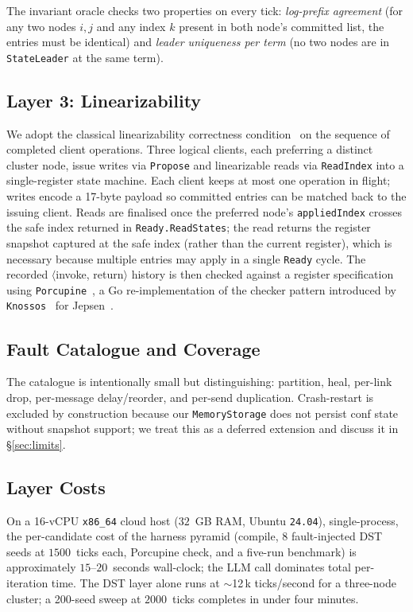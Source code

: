 \documentclass{article}
\begin{document}
The invariant oracle checks two properties on every tick:
\emph{log-prefix agreement} (for any two nodes $i,j$ and any index $k$
present in both node's committed list, the entries must be identical)
and \emph{leader uniqueness per term} (no two nodes are in
\texttt{StateLeader} at the same term).

\subsection{Layer 3: Linearizability}
\label{sec:harness-lin}
We adopt the classical linearizability
correctness condition~\cite{herlihy1990linearizability} on the
sequence of completed client operations. Three logical clients, each
preferring a distinct cluster node, issue writes via \texttt{Propose}
and linearizable reads via \texttt{ReadIndex} into a single-register
state machine. Each client
keeps at most one operation in flight; writes encode a 17-byte payload
 so committed entries can be matched
back to the issuing client. Reads are finalised once the preferred
node's \texttt{appliedIndex} crosses the safe index returned in
\texttt{Ready.ReadStates}; the read returns the register snapshot
captured at the safe index (rather than the current register), which
is necessary because multiple entries may apply in a single
\texttt{Ready} cycle. The recorded $\langle$invoke, return$\rangle$
history is then checked against a register specification using
\texttt{Porcupine}~\cite{porcupine}, a Go re-implementation of the
checker pattern introduced by \texttt{Knossos}~\cite{knossos} for
Jepsen~\cite{jepsen}.

\subsection{Fault Catalogue and Coverage}
The catalogue is intentionally small but distinguishing: partition,
heal, per-link drop, per-message delay/reorder, and per-send
duplication. Crash-restart is excluded by construction because our
\texttt{MemoryStorage} does not persist conf state without snapshot
support; we treat this as a deferred extension and discuss it in
\S\ref{sec:limits}.

\subsection{Layer Costs}
\label{sec:harness-cost}
On a 16-vCPU \texttt{x86\_64} cloud host ($32$~GB RAM, Ubuntu
\texttt{24.04}), single-process, the per-candidate cost of the
harness pyramid (compile, $8$ fault-injected DST seeds at $1500$~ticks
each, Porcupine check, and a five-run benchmark) is approximately
$15$--$20$~seconds wall-clock; the LLM call dominates total
per-iteration time. The DST layer alone runs at $\sim$12\,k
ticks/second for a three-node cluster; a 200-seed sweep at
$2000$~ticks completes in under four minutes.
\end{document}
